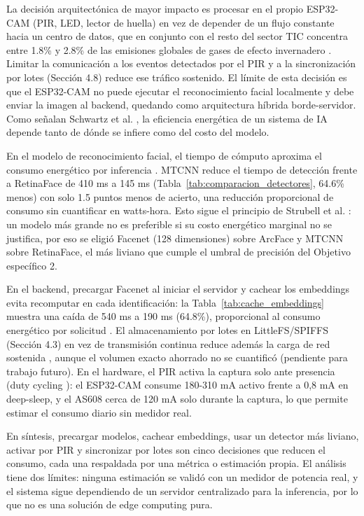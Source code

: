 \documentclass{iccmemoria}
\begin{document}
La decisión arquitectónica de mayor impacto es procesar en el propio ESP32-CAM (PIR, LED, lector de huella) en vez de depender de un flujo constante hacia un centro de datos, que en conjunto con el resto del sector TIC concentra entre 1.8\% y 2.8\% de las emisiones globales de gases de efecto invernadero \cite{freitag2021_ict_climate,masanet2020_datacenters}. Limitar la comunicación a los eventos detectados por el PIR y a la sincronización por lotes (Sección 4.8) reduce ese tráfico sostenido. El límite de esta decisión es que el ESP32-CAM no puede ejecutar el reconocimiento facial localmente y debe enviar la imagen al backend, quedando como arquitectura híbrida borde-servidor. Como señalan Schwartz et al. \cite{schwartz2020_greenai}, la eficiencia energética de un sistema de IA depende tanto de dónde se infiere como del costo del modelo.

En el modelo de reconocimiento facial, el tiempo de cómputo aproxima el consumo energético por inferencia \cite{garciamartin2019_mlenergy}. MTCNN reduce el tiempo de detección frente a RetinaFace de 410 ms a 145 ms (Tabla~\ref{tab:comparacion_detectores}, 64.6\% menos) con solo 1.5 puntos menos de acierto, una reducción proporcional de consumo sin cuantificar en watts-hora. Esto sigue el principio de Strubell et al. \cite{strubell2019_energypolicy}: un modelo más grande no es preferible si su costo energético marginal no se justifica, por eso se eligió Facenet (128 dimensiones) sobre ArcFace y MTCNN sobre RetinaFace, el más liviano que cumple el umbral de precisión del Objetivo específico 2.

En el backend, precargar Facenet al iniciar el servidor y cachear los embeddings evita recomputar en cada identificación: la Tabla~\ref{tab:cache_embeddings} muestra una caída de 540 ms a 190 ms (64.8\%), proporcional al consumo energético por solicitud \cite{garciamartin2019_mlenergy}. El almacenamiento por lotes en LittleFS/SPIFFS (Sección 4.3) en vez de transmisión continua reduce además la carga de red sostenida \cite{freitag2021_ict_climate}, aunque el volumen exacto ahorrado no se cuantificó (pendiente para trabajo futuro). En el hardware, el PIR activa la captura solo ante presencia (duty cycling \cite{chung2010_dutycycling}): el ESP32-CAM consume 180-310 mA activo frente a 0,8 mA en deep-sleep, y el AS608 cerca de 120 mA solo durante la captura, lo que permite estimar el consumo diario sin medidor real.

En síntesis, precargar modelos, cachear embeddings, usar un detector más liviano, activar por PIR y sincronizar por lotes son cinco decisiones que reducen el consumo, cada una respaldada por una métrica o estimación propia. El análisis tiene dos límites: ninguna estimación se validó con un medidor de potencia real, y el sistema sigue dependiendo de un servidor centralizado para la inferencia, por lo que no es una solución de edge computing pura.
\end{document}
